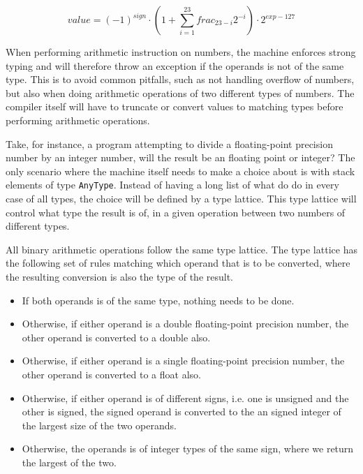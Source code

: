 \begin{equation}
  value = (-1)^{sign} \cdot (1 + \sum^{23}_{i=1} frac_{23-i}2^{-i}) \cdot 2^{exp - 127}
\end{equation}


When performing arithmetic instruction on numbers, the machine enforces strong
typing and will therefore throw an exception if the operands is not of the same
type. This is to avoid common pitfalls, such as not handling overflow of
numbers, but also when doing arithmetic operations of two different types of
numbers. The compiler itself will have to truncate or convert values to matching
types before performing arithmetic operations.

Take, for instance, a program attempting to divide a floating-point precision
number by an integer number, will the result be an floating point or integer?
The only scenario where the machine itself needs to make a choice about is with
stack elements of type {\tt AnyType}. Instead of having a long list of what do
do in every case of all types, the choice will be defined by a type
lattice. This type lattice will control what type the result is of, in a given
operation between two numbers of different types.

All binary arithmetic operations follow the same type lattice. The type lattice
has the following set of rules matching which operand that is to be converted,
where the resulting conversion is also the type of the result.

\begin{itemize}
  \item If both operands is of the same type, nothing needs to be done.
  \item Otherwise, if either operand is a double floating-point precision
    number, the other operand is converted to a double also.
  \item Otherwise, if either operand is a single floating-point precision
    number, the other operand is converted to a float also.
  \item Otherwise, if either operand is of different signs, i.e. one is unsigned
    and the other is signed, the signed operand is converted to the an signed
    integer of the largest size of the two operands.
  \item Otherwise, the operands is of integer types of the same sign, where we
    return the largest of the two.
\end{itemize}

